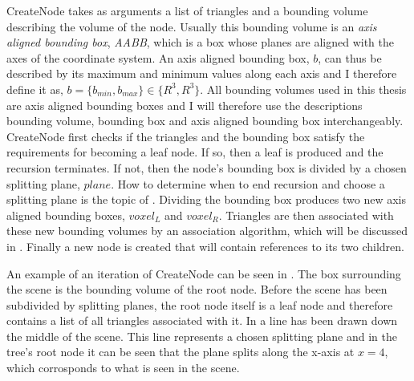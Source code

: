 CreateNode takes as arguments a list of triangles and a bounding volume
describing the volume of the node. Usually this bounding volume is an
\textit{axis aligned bounding box}, \textit{AABB}, which is a box whose planes
are aligned with the axes of the coordinate system. An axis aligned bounding
box, $b$, can thus be described by its maximum and minimum values along each
axis and I therefore define it as, $b = \{b_{min}, b_{max}\} \in \{R^3,
R^3\}$. All bounding volumes used in this thesis are axis aligned bounding boxes
and I will therefore use the descriptions bounding volume, bounding box and axis
aligned bounding box interchangeably. CreateNode first checks if the
triangles and the bounding box satisfy the requirements for becoming a leaf
node. If so, then a leaf is produced and the recursion terminates. If not, then
the node's bounding box is divided by a chosen splitting plane, $plane$. How to
determine when to end recursion and choose a splitting plane is the topic of
. Dividing the bounding box produces two new axis
aligned bounding boxes, $voxel_L$ and $voxel_R$. Triangles are then associated
with these new bounding volumes by an association algorithm, which will be
discussed in . Finally a new node is created
that will contain references to its two children.

An example of an iteration of CreateNode can be seen in
. The box surrounding the scene is the bounding volume
of the root node. Before the scene has been subdivided by splitting planes, the
root node itself is a leaf node and therefore contains a list of all triangles
associated with it. In  a line has been drawn down the
middle of the scene. This line represents a chosen splitting plane and in the
tree's root node it can be seen that the plane splits along the x-axis at $x=4$,
which corrosponds to what is seen in the scene.

